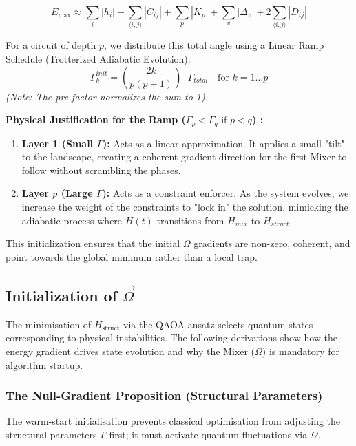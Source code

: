 \documentclass[12pt, a4paper, oneside]{report}
\begin{document}
\begin{equation}
    E_{\max} \approx \sum_i |h_i| + \sum_{\langle i,j \rangle} |C_{ij}| + \sum_p |K_p| + \sum_v |\Delta_v| + 2 \sum_{\langle i,j \rangle} |D_{ij}|
\end{equation}

For a circuit of depth $p$, we distribute this total angle using a Linear Ramp Schedule (Trotterized Adiabatic Evolution):
\begin{equation}
    \Gamma_k^{init} = \left( \frac{2k}{p(p+1)} \right) \cdot \Gamma_{total} \quad \text{for } k=1 \dots p
\end{equation}
\textit{(Note: The pre-factor normalizes the sum to 1).}

\textbf{Physical Justification for the Ramp ($\Gamma_p < \Gamma_q \text{ if } p<q$) :}
\begin{enumerate}
    \item \textbf{Layer 1 (Small $\Gamma$):} Acts as a linear approximation. It applies a small "tilt" to the landscape, creating a coherent gradient direction for the first Mixer to follow without scrambling the phases.
    \item \textbf{Layer $p$ (Large $\Gamma$):} Acts as a constraint enforcer. As the system evolves, we increase the weight of the constraints to "lock in" the solution, mimicking the adiabatic process where $H(t)$ transitions from $H_{mix}$ to $H_{struct}$.
\end{enumerate}

This initialization ensures that the initial $\Omega$ gradients are non-zero, coherent, and point towards the global minimum rather than a local trap.

\subsection{Initialization of $\vec{\Omega}$}

The minimisation of $H_{\text{struct}}$ via the QAOA ansatz selects quantum states corresponding to physical instabilities. The following derivations show how the energy gradient drives state evolution and why the Mixer ($\Omega$) is mandatory for algorithm startup.

\subsubsection{The Null-Gradient Proposition (Structural Parameters)}
\label{sec:null-gradient}
The warm-start initialisation prevents classical optimisation from adjusting the structural parameters $\Gamma$ first; it must activate quantum fluctuations via $\Omega$.
\end{document}
